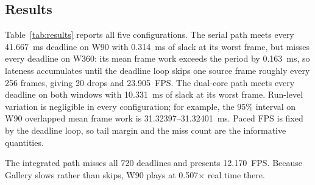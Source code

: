 \documentclass[11pt,twocolumn]{article}
\newcommand{\system}{RV565}
\begin{document}
\subsection{Results}
\label{sec:standalone-results}

\begin{table}[!t]
\centering
\caption{Measured \system{} v6 frame work.  Standalone rows pool ten runs of
720 frames; the integrated row is one 720-frame run.  Integrated playback does
not skip frames when late, so drops are not applicable (n/a).}
\label{tab:results}
\end{table}

Table~\ref{tab:results} reports all five configurations.  The serial path
meets every 41.667~ms deadline on W90 with 0.314~ms of slack at its worst
frame, but misses every deadline on W360: its mean frame work exceeds the
period by 0.163~ms, so lateness accumulates until the deadline loop skips one
source frame roughly every 256 frames, giving 20 drops and 23.905~FPS.  The
dual-core path meets every deadline on both windows with 10.331~ms of slack
at its worst frame.  Run-level variation is negligible in every
configuration; for example, the 95\% interval on W90 overlapped mean frame
work is 31.32397--31.32401~ms.  Paced FPS is fixed by the deadline loop, so tail
margin and the miss count are the informative quantities.

The integrated path misses all 720 deadlines and presents 12.170~FPS.
Because Gallery slows rather than skips, W90 plays at 0.507$\times$ real
time there.
\end{document}
